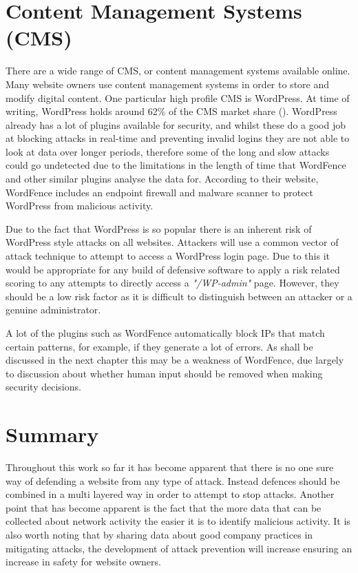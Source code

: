 \section{Content Management Systems (CMS)}

There are a wide range of CMS, or content management systems available online. Many website owners use content management systems in order to store and modify digital content. One particular high profile CMS is WordPress. At time of writing, WordPress holds around 62\% of the CMS market share (\cite{Wordpress}). WordPress already has a lot of plugins available for security, and whilst these do a good job at blocking attacks in real-time and preventing invalid logins they are not able to look at data over longer periods, therefore some of the long and slow attacks could go undetected due to the limitations in the length of time that WordFence and other similar plugins analyse the data for. According to their website, WordFence includes an endpoint firewall and malware scanner to protect WordPress from malicious activity. 

Due to the fact that WordPress is so popular there is an inherent risk of WordPress style attacks on all websites. Attackers will use a common vector of attack technique to attempt to access a WordPress login page. Due to this it would be appropriate for any build of defensive software to apply a risk related scoring to any attempts to directly access a \textit{"/WP-admin"} page. However, they should be a low risk factor as it is difficult to distinguish between an attacker or a genuine administrator.

A lot of the plugins such as WordFence automatically block IPs that match certain patterns, for example, if they generate a lot of errors. As shall be discussed in the next chapter this may be a weakness of WordFence, due largely to discussion about whether human input should be removed when making security decisions.

\section{Summary}
Throughout this work so far it has become apparent that there is no one sure way of defending a website from any type of attack. Instead defences should be combined in a multi layered way in order to attempt to stop attacks. Another point that has become apparent is the fact that the more data that can be collected about network activity the easier it is to identify malicious activity. It is also worth noting that by sharing data about good company practices in mitigating attacks, the development of attack prevention will increase ensuring an increase in safety for website owners.